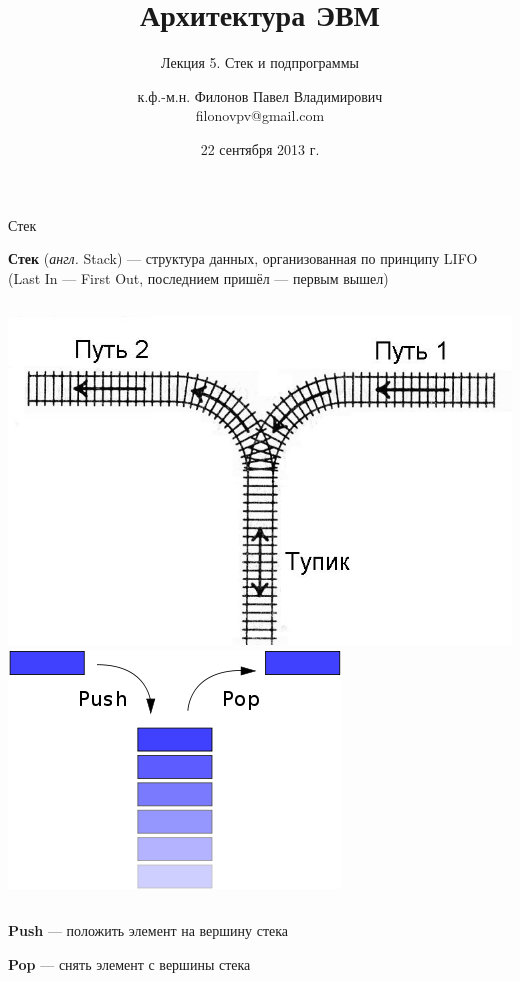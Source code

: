 \documentclass[utf8, russian]{beamer}
\title{Архитектура ЭВМ}
\subtitle{Лекция 5. Стек и подпрограммы}
\author{к.ф.-м.н. Филонов Павел Владимирович \\ filonovpv@gmail.com}
\date{22 сентября 2013 г.}
\institute[МГТУ ГА] 
{
    Московский Государственный Технический Университет \\
    Гражданской Авиации
}
\begin{document}
    \frame{\titlepage}
    \begin{frame}{Стек}

        {\bf Стек } ({\it англ.} Stack) --- структура данных, организованная по принципу LIFO (Last In --- First Out, последнием пришёл --- первым вышел)
    \begin{columns}
            \includegraphics[width=\linewidth]{fig/stack_rails.jpg}
            \includegraphics[width=\linewidth]{fig/stack.png}
    \end{columns}
    {\bf Push} --- положить элемент на вершину стека

    {\bf Pop} --- снять элемент с вершины стека
    \end{frame}
\end{document}
